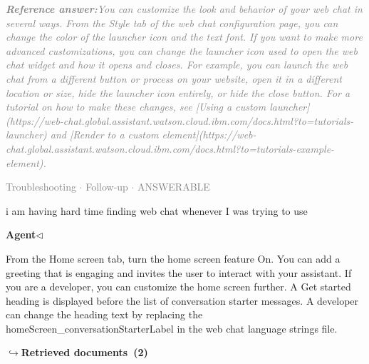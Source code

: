 \documentclass[a4paper,11pt]{article}
\begin{document}
\begin{refanswerenv}
{\footnotesize\textit{\textcolor{gray}{\textbf{Reference answer:}\enspace You can customize the look and behavior of your web chat in several ways. From the Style tab of the web chat configuration page, you can change the color of the launcher icon and the text font. If you want to make more advanced customizations, you can change the launcher icon used to open the web chat widget and how it opens and closes. For example, you can launch the web chat from a different button or process on your website, open it in a different location or size, hide the launcher icon entirely, or hide the close button. For a tutorial on how to make these changes, see [Using a custom launcher](https://web-chat.global.assistant.watson.cloud.ibm.com/docs.html?to=tutorials-launcher) and [Render to a custom element](https://web-chat.global.assistant.watson.cloud.ibm.com/docs.html?to=tutorials-example-element).}}}
\end{refanswerenv}
\vspace{0.5em}
\hfill{\tiny\textcolor{gray}{Troubleshooting $\cdot$ Follow-up $\cdot$ ANSWERABLE}}
\begin{userbubble}
i am having hard time finding web chat whenever I was trying to use
\end{userbubble}
\noindent\hfill{\small\textcolor{agentcolor}{\textbf{Agent\enspace$\triangleleft$}}}
\begin{agentbubble}
From the Home screen tab, turn the home screen feature On. You can add a greeting that is engaging and invites the user to interact with your assistant. If you are a developer, you can customize the home screen further. A Get started heading is displayed before the list of conversation starter messages. A developer can change the heading text by replacing the homeScreen\_conversationStarterLabel in the web chat language strings file.
\end{agentbubble}
\noindent\hfill{\footnotesize\textcolor{doccolor}{\textbf{$\hookrightarrow$\enspace Retrieved documents~(2)}}}
\end{document}
